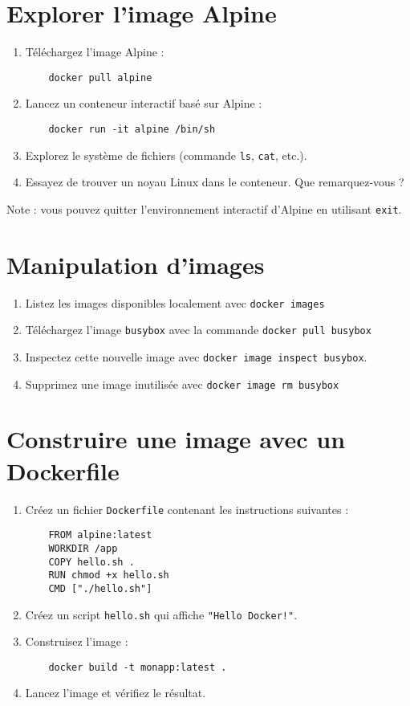 \documentclass{article}%
\begin{document}
\section{Explorer l'image Alpine}
\begin{enumerate}
    \item Téléchargez l’image Alpine :
    \begin{verbatim}
    docker pull alpine
    \end{verbatim}
    \item Lancez un conteneur interactif basé sur Alpine :
    \begin{verbatim}
    docker run -it alpine /bin/sh
    \end{verbatim}
    \item Explorez le système de fichiers (commande \texttt{ls}, \texttt{cat}, etc.).
    \item Essayez de trouver un noyau Linux dans le conteneur. Que remarquez-vous ?
\end{enumerate}

Note : vous pouvez quitter l'environnement interactif d'Alpine en utilisant \texttt{exit}.

\section{Manipulation d’images}
\begin{enumerate}
    \item Listez les images disponibles localement avec \texttt{docker images}
    \item Téléchargez l'image \texttt{busybox} avec la commande \texttt{docker pull busybox}
    \item Inspectez  cette nouvelle image avec \texttt{docker image inspect busybox}.
    \item Supprimez une image inutilisée avec \texttt{docker image rm busybox}
\end{enumerate}

\section{Construire une image avec un Dockerfile}
\begin{enumerate}
    \item Créez un fichier \texttt{Dockerfile} contenant les instructions suivantes :
    \begin{verbatim}
    FROM alpine:latest
    WORKDIR /app
    COPY hello.sh .
    RUN chmod +x hello.sh
    CMD ["./hello.sh"]
    \end{verbatim}
    \item Créez un script \texttt{hello.sh} qui affiche \texttt{"Hello Docker!"}.
    \item Construisez l’image :
    \begin{verbatim}
    docker build -t monapp:latest .
    \end{verbatim}
    \item Lancez l’image et vérifiez le résultat.
\end{enumerate}
\end{document}
